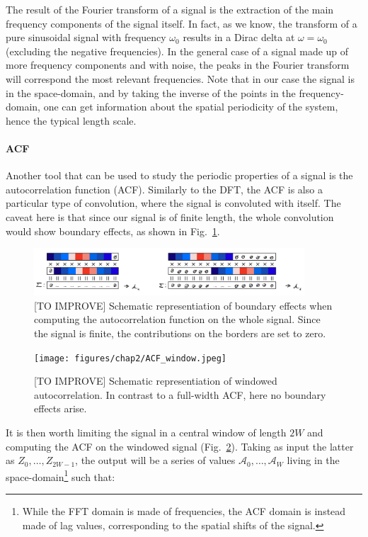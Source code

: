 The result of the Fourier transform of a signal is the extraction of the main frequency components of the signal itself. In fact, as we know, the transform of a pure sinusoidal signal with frequency $\omega_0$ results in a Dirac delta at $\omega = \omega_0$ (excluding the negative frequencies). In the general case of a signal made up of more frequency components and with noise, the peaks in the Fourier transform will correspond the most relevant frequencies. Note that in our case the signal is in the space-domain, and by taking the inverse of the points in the frequency-domain, one can get information about the spatial periodicity of the system, hence the typical length scale.

\paragraph{ACF}
Another tool that can be used to study the periodic properties of a signal is the autocorrelation function (ACF). Similarly to the DFT, the ACF is also a particular type of convolution, where the signal is convoluted with itself. The caveat here is that since our signal is of finite length, the whole convolution would show boundary effects, as shown in Fig.\ \ref{fig:ACF_bound}.
\begin{figure}[h!]
    \centering
    \includegraphics[width=0.9\textwidth]{figures/chap2/ACF_bound.jpeg}
    \caption{[TO IMPROVE] Schematic representiation of boundary effects when computing the autocorrelation function on the whole signal. Since the signal is finite, the contributions on the borders are set to zero.}
    \label{fig:ACF_bound}
\end{figure}
\begin{figure}[h!]
    \centering
    \texttt{[image: figures/chap2/ACF\_window.jpeg]}
    \caption{[TO IMPROVE] Schematic representiation of windowed autocorrelation. In contrast to a full-width ACF, here no boundary effects arise.}
    \label{fig:ACF_window}
\end{figure}
It is then worth limiting the signal in a central window of length $2W$ and computing the ACF on the windowed signal (Fig.\ \ref{fig:ACF_window}). Taking as input the latter as $Z_0,\dots,Z_{2W-1}$, the output will be a series of values $\mathcal{A}_0,\dots,\mathcal{A}_{W}$ living in the space-domain\footnote{While the FFT domain is made of frequencies, the ACF domain is instead made of lag values, corresponding to the spatial shifts of the signal.} such that:

